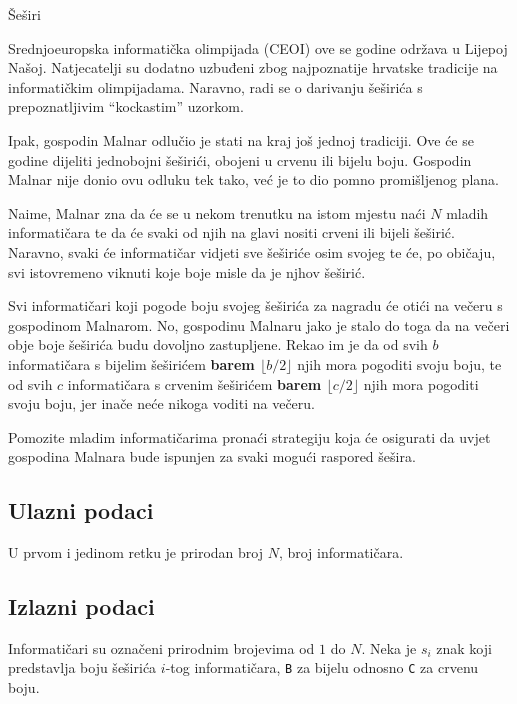 \begin{statement}[
  problempoints=100,
  timelimit=3 sekunde,
  memorylimit=512 MiB,
]{Šeširi}

Srednjoeuropska informatička olimpijada (CEOI) ove se godine održava u Lijepoj
Našoj. Natjecatelji su dodatno uzbuđeni zbog najpoznatije hrvatske tradicije na
informatičkim olimpijadama. Naravno, radi se o darivanju šeširića s
prepoznatljivim ``kockastim'' uzorkom.

Ipak, gospodin Malnar odlučio je stati na kraj još jednoj tradiciji. Ove će se
godine dijeliti jednobojni šeširići, obojeni u crvenu ili bijelu boju. Gospodin
Malnar nije donio ovu odluku tek tako, već je to dio pomno promišljenog plana.

Naime, Malnar zna da će se u nekom trenutku na istom mjestu naći $N$ mladih
informatičara te da će svaki od njih na glavi nositi crveni ili bijeli
šeširić.  Naravno, svaki će informatičar vidjeti sve šeširiće osim svojeg te
će, po običaju, svi istovremeno viknuti koje boje misle da je njhov šeširić.

Svi informatičari koji pogode boju svojeg šeširića za nagradu će otići na večeru
s gospodinom Malnarom. No, gospodinu
Malnaru jako je stalo do toga da na večeri obje boje šeširića budu dovoljno
zastupljene. Rekao im je da od svih $b$ informatičara s bijelim
šeširićem \textbf{barem $\lfloor b/2 \rfloor$} njih mora pogoditi svoju boju, te od svih
$c$ informatičara s crvenim šeširićem \textbf{barem $\lfloor c/2 \rfloor$} njih mora
pogoditi svoju boju, jer inače neće nikoga voditi na večeru.

Pomozite mladim informatičarima pronaći strategiju koja će osigurati da uvjet
gospodina Malnara bude ispunjen za svaki mogući raspored šešira.

\subsection*{Ulazni podaci}
U prvom i jedinom retku je prirodan broj $N$, broj informatičara.

\subsection*{Izlazni podaci}

Informatičari su označeni prirodnim brojevima od $1$ do $N$.
Neka je $s_i$ znak koji predstavlja boju šeširića $i$-tog informatičara, \texttt{B}
za bijelu odnosno \texttt{C} za crvenu boju.


\end{statement}
